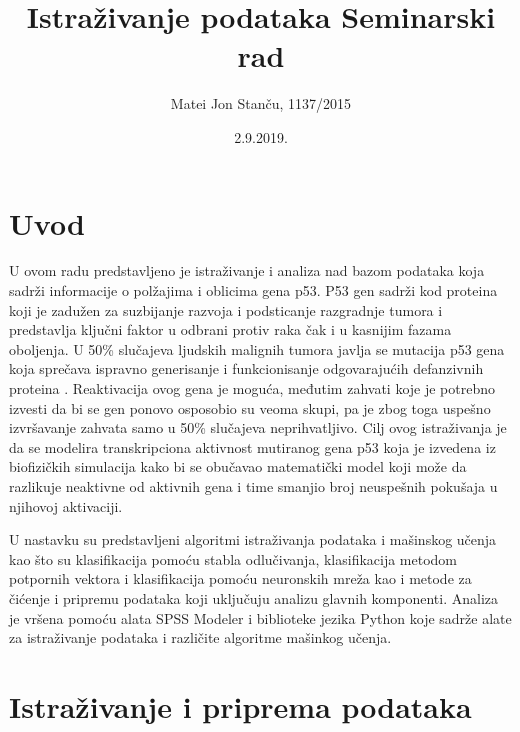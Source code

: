 \documentclass[12pt]{article}
\title{%
	{\bf \huge  Istraživanje podataka}
	\vskip 0.1in
	{\LARGE Seminarski rad}
	\vskip 0.2in}
\date{2.9.2019.}
\author{Matei Jon Stanču, 1137/2015}
\begin{document}

	\maketitle

	\newpage	


	\renewcommand{\contentsname}{Sadržaj}
	
	\renewcommand\refname{Reference}

	\tableofcontents

	\newpage


\section{Uvod}

U ovom radu predstavljeno je istraživanje i analiza nad bazom podataka koja sadrži informacije o polžajima i oblicima gena p53. P53 gen sadrži kod proteina koji je zadužen za suzbijanje razvoja i podsticanje razgradnje tumora i predstavlja ključni faktor u odbrani protiv raka čak i u kasnijim fazama oboljenja. U 50\% slučajeva ljudskih malignih tumora javlja se mutacija p53 gena koja sprečava ispravno generisanje i funkcionisanje odgovarajućih defanzivnih proteina \cite{active-learning}. Reaktivacija ovog gena je moguća, međutim zahvati koje je potrebno izvesti da bi se gen ponovo osposobio su veoma skupi, pa je zbog toga uspešno izvršavanje zahvata samo u 50\% slučajeva neprihvatljivo. Cilj ovog istraživanja je da se modelira transkripciona aktivnost mutiranog gena p53 koja je izvedena iz biofizičkih simulacija kako bi se obučavao matematički model koji može da razlikuje neaktivne od aktivnih gena i time smanjio broj neuspešnih pokušaja u njihovoj aktivaciji.

U nastavku su predstavljeni algoritmi istraživanja podataka i mašinskog učenja kao što su klasifikacija pomoću stabla odlučivanja, klasifikacija metodom potpornih vektora i klasifikacija pomoću neuronskih mreža kao i metode za čićenje i pripremu podataka koji uključuju analizu glavnih komponenti. Analiza je vršena pomoću alata SPSS Modeler i biblioteke jezika Python koje sadrže alate za istraživanje podataka i različite algoritme mašinkog učenja. 


\section {Istraživanje i priprema podataka}
\end{document}
